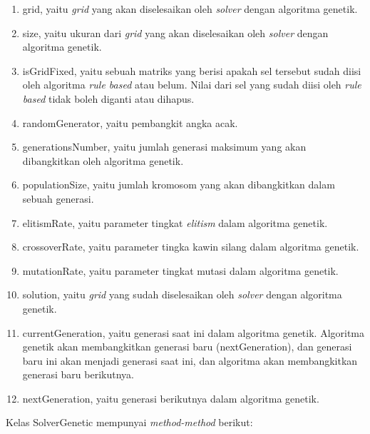 \begin{enumerate}
\item grid, yaitu \textit{grid} yang akan diselesaikan oleh \textit{solver} dengan algoritma genetik.
\item size, yaitu ukuran dari \textit{grid} yang akan diselesaikan oleh \textit{solver} dengan algoritma genetik.
\item isGridFixed, yaitu sebuah matriks yang berisi apakah sel tersebut sudah diisi oleh algoritma \textit{rule based} atau belum. Nilai dari sel yang sudah diisi oleh \textit{rule based} tidak boleh diganti atau dihapus.
\item randomGenerator, yaitu pembangkit angka acak.
\item generationsNumber, yaitu jumlah generasi maksimum yang akan dibangkitkan oleh algoritma genetik.
\item populationSize, yaitu jumlah kromosom yang akan dibangkitkan dalam sebuah generasi.
\item elitismRate, yaitu parameter tingkat \textit{elitism} dalam algoritma genetik.
\item crossoverRate, yaitu parameter tingka kawin silang dalam algoritma genetik.
\item mutationRate, yaitu parameter tingkat mutasi dalam algoritma genetik.
\item solution, yaitu \textit{grid} yang sudah diselesaikan oleh \textit{solver} dengan algoritma genetik.
\item currentGeneration, yaitu generasi saat ini dalam algoritma genetik. Algoritma genetik akan membangkitkan generasi baru (nextGeneration), dan generasi baru ini akan menjadi generasi saat ini, dan algoritma akan membangkitkan generasi baru berikutnya.
\item nextGeneration, yaitu generasi berikutnya dalam algoritma genetik.
\end{enumerate}

Kelas SolverGenetic mempunyai \textit{method-method} berikut:

